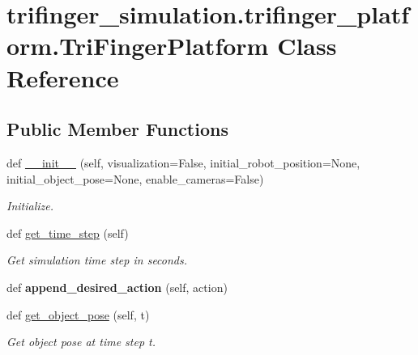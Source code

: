 \hypertarget{classtrifinger__simulation_1_1trifinger__platform_1_1TriFingerPlatform}{}\section{trifinger\+\_\+simulation.\+trifinger\+\_\+platform.\+Tri\+Finger\+Platform Class Reference}
\label{classtrifinger__simulation_1_1trifinger__platform_1_1TriFingerPlatform}
\subsection*{Public Member Functions}
\begin{DoxyCompactItemize}
\item 
def \hyperlink{classtrifinger__simulation_1_1trifinger__platform_1_1TriFingerPlatform_a7005f891e60191ac633dc676129235d3}{\+\_\+\+\_\+init\+\_\+\+\_\+} (self, visualization=False, initial\+\_\+robot\+\_\+position=None, initial\+\_\+object\+\_\+pose=None, enable\+\_\+cameras=False)
\begin{DoxyCompactList}\small\item\em Initialize. \end{DoxyCompactList}\item 
def \hyperlink{classtrifinger__simulation_1_1trifinger__platform_1_1TriFingerPlatform_ada1b2f4cbf62c8fe0cd36617b0935786}{get\+\_\+time\+\_\+step} (self)
\begin{DoxyCompactList}\small\item\em Get simulation time step in seconds. \end{DoxyCompactList}\item 
\mbox{\label{classtrifinger__simulation_1_1trifinger__platform_1_1TriFingerPlatform_aa0fc01b9ecadb2b3e740ca1d3feedc1a}} 
def {\bfseries append\+\_\+desired\+\_\+action} (self, action)
\item 
def \hyperlink{classtrifinger__simulation_1_1trifinger__platform_1_1TriFingerPlatform_ad46ed81c3e6c557c9cce2ce919b6110b}{get\+\_\+object\+\_\+pose} (self, t)
\begin{DoxyCompactList}\small\item\em Get object pose at time step t. \end{DoxyCompactList}\item 

\end{DoxyCompactItemize}
